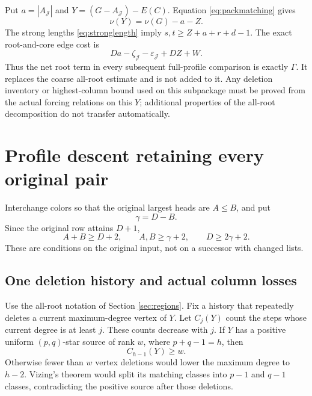 \documentclass[11pt,a4paper]{article}
\theoremstyle{definition}
\begin{document}
Put $a=|A_{\mathcal J}|$ and
$Y=(G-A_{\mathcal J})-E(C)$. Equation \eqref{eq:packmatching} gives
\[
\nu(Y)=\nu(G)-a-Z.
\]
The strong lengths \eqref{eq:stronglength} imply $s,t\ge Z+a+r+d-1$. The exact root-and-core edge cost is
\[
Da-\zeta_{\mathcal J}-\varepsilon_{\mathcal J}+DZ+W.
\]
Thus the net root term in every subsequent full-profile comparison is exactly $\Gamma$. It replaces the coarse all-root estimate and is not added to it. Any deletion inventory or highest-column bound used on this subpackage must be proved from the actual forcing relations on this $Y$; additional properties of the all-root decomposition do not transfer automatically.


\section{Profile descent retaining every original pair}\label{sec:profile-descent}
Interchange colors so that the original largest heads are $A\le B$, and put
\[
\gamma=D-B.
\]
Since the original row attains $D+1$,
\begin{equation}\label{eq:gaprange}
A+B\ge D+2,\qquad A,B\ge\gamma+2,\qquad D\ge2\gamma+2.
\end{equation}
These are conditions on the original input, not on a successor with changed lists.

\subsection{One deletion history and actual column losses}
Use the all-root notation of Section \ref{sec:regions}. Fix a history that repeatedly deletes a current maximum-degree vertex of $Y$. Let $C_j(Y)$ count the steps whose current degree is at least $j$. These counts decrease with $j$. If $Y$ has a positive uniform $(p,q)$-star source of rank $w$, where $p+q-1=h$, then
\begin{equation}\label{eq:inventory}
C_{h-1}(Y)\ge w.
\end{equation}
Otherwise fewer than $w$ vertex deletions would lower the maximum degree to $h-2$. Vizing's theorem would split its matching classes into $p-1$ and $q-1$ classes, contradicting the positive source after those deletions.
\end{document}
